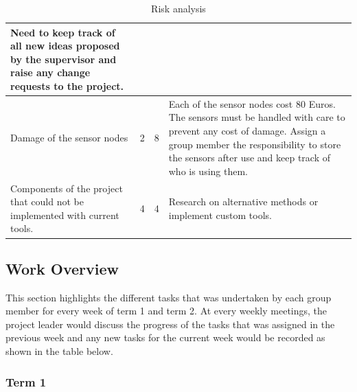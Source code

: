 \begin{table}[H]
\begin{tabular}{| p{4cm} | l | l | p{7cm} |}
Need to keep track of all new ideas proposed by the supervisor and raise any change requests to the project.

	\\ \hline
		
	Damage of the sensor nodes
	& 2 & 8 & Each of the sensor nodes cost 80 Euros. The sensors must be handled with care to prevent any cost of damage. Assign a group member the responsibility to store the sensors after use and keep track of who is using them.
	
	\\ \hline
		
	Components of the project that could not be implemented with current tools.
	& 4 & 4 & Research on alternative methods or implement custom tools.
	\\ \hline
\end{tabular}
\caption{Risk analysis}
\label{tab:risk}
\end{table}

\subsection{Work Overview}

This section highlights the different tasks that was undertaken by each group member for every week of term 1 and term 2. At every weekly meetings, the project leader would discuss the progress of the tasks that was assigned in the previous week and any new tasks for the current week would be recorded as shown in the table below.

\subsubsection*{Term 1}

